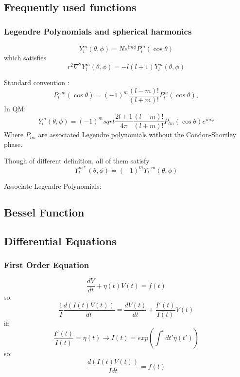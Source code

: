 \subsection{Frequently used functions}

\subsubsection{Legendre Polynomials and spherical harmonics}
\begin{equation}
    Y^m_l(\theta,\phi)=Ne^{im\phi}P^m_l(\cos\theta)
\end{equation}
which satisfies
\[
    r^2\nabla^2Y^m_l(\theta,\phi)=-l(l+1)Y^m_l(\theta,\phi)
    \]

Standard convention :
\[
    P^{-m}_l(\cos\theta)=(-1)^m\frac{(l-m)!}{(l+m)!}P^m_l(\cos\theta),
\]
In QM:
\[
    Y^m_l(\theta,\phi)=(-1)^msqrt{\frac{2l+1}{4\pi}\frac{(l-m)!}{(l+m)!}}P_{lm}(\cos\theta)e^{im\phi}
\]
Where $P_{lm}$ are associated Legendre polynomials without the
Condon-Shortley phase.

Though of different definition, all of them satisfy
\[ 
    Y_l^{m*}(\theta,\phi)=(-1)^{m}Y_{l}^{-m}(\theta,\phi) 
    \]


Associate Legendre Polynomials:

\subsection{Bessel Function}
\subsection{Differential Equations}

\subsubsection{First Order Equation}
\[ 
\frac{dV}{dt} + \eta(t)V(t) = f(t)  
\]
so:
\[
    \frac{1}{I}\frac{d(I(t)V(t))}{dt} = \frac{dV(t)}{dt} + \frac{I'(t)}{I(t)}V(t)
    \]
if: 
\[ 
    \frac{I'(t)}{I(t)} = \eta(t)	\rightarrow I(t) = exp(\int^{t}dt'\eta(t'))
    \]
so:
\[ \frac{d(I(t)V(t))}{I dt} = f(t)\]

